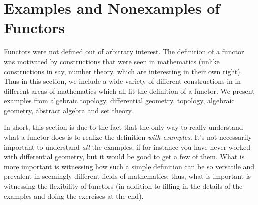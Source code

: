                         



    \newpage
    \section{Examples and Nonexamples of Functors}
    Functors were not defined out of arbitrary interest. The definition of a functor 
    was motivated by constructions that were seen in mathematics
    (unlike constructions in say, number theory, which 
    are interesting in their own right). 
    Thus in this section, we include a wide variety of different constructions in 
    in different areas of mathematics which all fit the definition of a functor. 
    We present examples 
    from algebraic topology, differential geometry, topology, algebraic geometry, 
    abstract algebra and set theory.

    In short, this section is due to the fact that the only way to really understand what a functor does is to realize 
    the definition \emph{with examples}.  It's not necessarily important to understand \emph{all} 
    the examples, if for instance you have never worked with differential geometry, 
    but it would be good to get a few of them. What is more important is 
    witnessing how such a simple definition can be so versatile and prevalent
    in seemingly different fields of mathematics; thus, what is important is 
    witnessing the flexibility of functors (in addition to filling in the details of 
    the examples and doing the exercises at the end).
    \\



